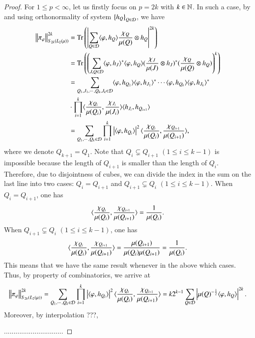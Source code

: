 \documentclass[leqno]{amsart}
\begin{document}
\begin{proof}
For $1\leq p<\infty$, let us firstly focus on $p=2k$ with $k\in\mathbb{N}$. In such a case, by  and using orthonormality of system $\left\{ h_{Q} \right\}_{Q\in{\mathcal D}}$, we have
\begin{align*}
\left\| \pi_{\varphi} \right\|_{S_{2k}(L_{2}(\mu))}^{2k}
&={\rm Tr}\left(\left|\sum_{Q\in{\mathcal D}}\langle \varphi,h_{Q} \rangle\frac{\chi_{Q}}{\mu(Q)}\otimes h_{Q}\right|^{2k}\right)\\
&={\rm Tr}\left(\left(\sum_{J,Q\in{\mathcal D}}\langle \varphi,h_{J} \rangle^{*}\langle \varphi,h_{Q} \rangle
(\frac{\chi_{J}}{\mu(J)}\otimes h_{J})^{*}
(\frac{\chi_{Q}}{\mu(Q)}\otimes h_{Q})\right)^{k}\right)\\
&=\sum_{Q_{1},J_{1},\cdots,Q_{k},J_{k}\in{\mathcal D}}\langle \varphi,h_{Q_{1}} \rangle\langle \varphi,h_{J_{1}} \rangle^{*}
\cdots\langle \varphi,h_{Q_{k}} \rangle\langle \varphi,h_{J_{k}} \rangle^{*}\\
&\cdot\prod_{i=1}^{k}\langle \frac{\chi_{Q_{i}}}{\mu(Q_{i})},\frac{\chi_{J_{i}}}{\mu(J_{i})} \rangle
\langle h_{J_{i}}, h_{Q_{i+1}} \rangle\\
&=\sum_{Q_{1},\cdots,Q_{k}\in{\mathcal D}}\prod_{i=1}^{k}\left|\langle \varphi,h_{Q_{i}} \rangle\right|^{2}
\langle \frac{\chi_{Q_{i}}}{\mu(Q_{i})},\frac{\chi_{Q_{i+1}}}{\mu(Q_{i+1})} \rangle,
\end{align*}
where we denote $Q_{k+1}=Q_{1}$. Note that $Q_{i}\subsetneq Q_{i+1}$ $(1\leq i\leq k-1)$ is impossible because the length of $Q_{i+1}$ is smaller than the length of $Q_{i}$. Therefore, due to disjointness of cubes, we can divide the index in the sum on the last line into two cases: $Q_{i}=Q_{i+1}$ and $Q_{i+1}\subsetneq Q_{i}$ $(1\leq i\leq k-1)$. When $Q_{i}=Q_{i+1}$, one has
$$\langle \frac{\chi_{Q_{i}}}{\mu(Q_{i})},\frac{\chi_{Q_{i+1}}}{\mu(Q_{i+1})} \rangle
=\frac{1}{\mu(Q_{i})}.$$
When $Q_{i+1}\subsetneq Q_{i}$ $(1\leq i\leq k-1)$, one has
$$\langle \frac{\chi_{Q_{i}}}{\mu(Q_{i})},\frac{\chi_{Q_{i+1}}}{\mu(Q_{i+1})} \rangle
=\frac{\mu(Q_{i+1})}{\mu(Q_{i})\mu(Q_{i+1})}
=\frac{1}{\mu(Q_{i})}.$$
This means that we have the same result whenever in the above which cases. Thus, by property of combinatorics, we arrive at
\begin{align*}
\left\| \pi_{\varphi} \right\|_{S_{2k}(L_{2}(\mu))}^{2k}
=\sum_{Q_{1},\cdots,Q_{k}\in{\mathcal D}}\prod_{i=1}^{k}\left|\langle \varphi,h_{Q_{i}} \rangle\right|^{2}
\langle \frac{\chi_{Q_{i}}}{\mu(Q_{i})},\frac{\chi_{Q_{i+1}}}{\mu(Q_{i+1})} \rangle
=k2^{k-1}\sum_{Q\in{\mathcal D}}\left|\mu(Q)^{-\frac{1}{2}}\langle \varphi,h_{Q} \rangle\right|^{2k}.
\end{align*}
Moreover, by interpolation ???,


...............................
\end{proof}
\end{document}
